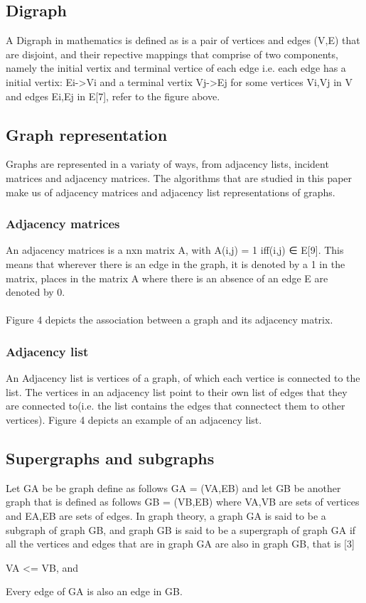 \subsection{Digraph}
A Digraph in mathematics is defined as is a pair of vertices and edges (V,E) that are disjoint, and their repective mappings that comprise of two components, namely the initial vertix and 
terminal vertice of each edge i.e. each edge has a initial vertix: Ei->Vi and a terminal vertix Vj->Ej for some vertices Vi,Vj in V and edges Ei,Ej in E[7], refer to the figure above.

\subsection{Graph representation}
Graphs are represented in a variaty of ways, from adjacency lists, incident matrices and adjacency matrices. The algorithms that are studied in this paper make us of adjacency matrices and
adjacency list representations of graphs. 

\subsubsection{Adjacency matrices}
An adjacency matrices is a nxn matrix A, with A(i,j) = 1 iff(i,j) ∈ E[9]. This means that wherever there is an edge in the graph, it is denoted by a 1 in the matrix, places in the matrix A where there is an absence of an edge E are denoted by 0.\\\\
Figure 4 depicts the association between a graph and its adjacency matrix.

\subsubsection{Adjacency list}
An Adjacency list is vertices of a graph, of which each vertice is connected to the list. The vertices in an adjacency list point to their own list of edges that they are connected to(i.e. the list contains the edges that connectect them to other vertices).
Figure 4 depicts an example of an adjacency list.

\subsection{Supergraphs and subgraphs}
Let GA be be graph define as follows GA = (VA,EB) and let GB be another graph that is defined as follows GB = (VB,EB) where VA,VB are sets of vertices and EA,EB are sets of edges.
In graph theory, a graph GA is said to be a subgraph of graph GB, and graph GB is said to be a supergraph of graph GA if all the vertices and edges that are in graph GA are also in graph
GB, that is [3]\newline\newline

\begin{myEnumerate}
  \item VA <= VB, and
  \item Every edge of GA is also an edge in GB.
\end{myEnumerate}
